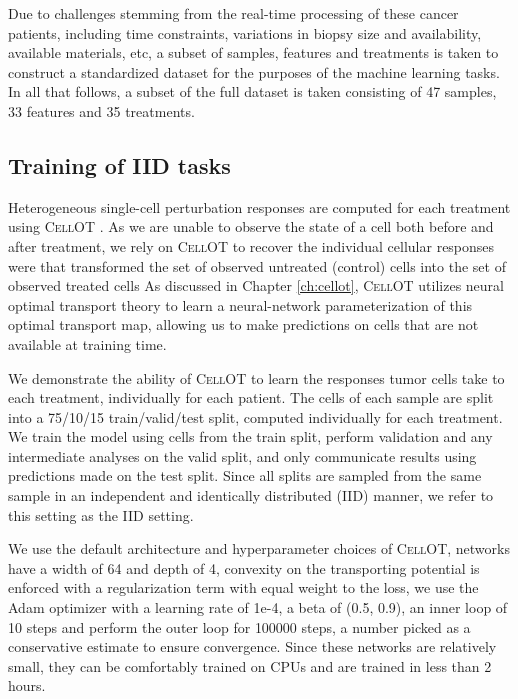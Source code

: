 Due to challenges stemming from the real-time processing of these cancer patients, including time constraints, variations in biopsy size and availability, available materials, etc, a subset of samples, features and treatments is taken to construct a standardized dataset for the purposes of the machine learning tasks.
In all that follows, a subset of the full dataset is taken consisting of 47 samples, 33 features and 35 treatments.



\subsection{Training of IID tasks}
Heterogeneous single-cell perturbation responses are computed for each treatment using \textsc{CellOT} \cite{bunne2023}.
As we are unable to observe the state of a cell both before and after treatment, we rely on \textsc{CellOT} to recover the individual cellular responses were that transformed the set of observed untreated (control) cells into the set of observed treated cells
As discussed in Chapter \ref{ch:cellot}, \textsc{CellOT} utilizes neural optimal transport theory to learn a neural-network parameterization of this optimal transport map, allowing us to make predictions on cells that are not available at training time.

We demonstrate the ability of \textsc{CellOT} to learn the responses tumor cells take to each treatment, individually for each patient. The cells of each sample are split into a 75/10/15 train/valid/test split, computed individually for each treatment. We train the model using cells from the train split, perform validation and any intermediate analyses on the valid split, and only communicate results using predictions made on the test split. Since all splits are sampled from the same sample in an independent and identically distributed (IID) manner, we refer to this setting as the IID setting.

We use the default architecture and hyperparameter choices of \textsc{CellOT}, networks have a width of 64 and depth of 4, convexity on the transporting potential is enforced with a regularization term with equal weight to the loss, we use the Adam optimizer \cite{kingma2014} with a learning rate of 1e-4, a beta of (0.5, 0.9), an inner loop of 10 steps and perform the outer loop for 100000 steps, a number picked as a conservative estimate to ensure convergence. Since these networks are relatively small, they can be comfortably trained on CPUs and are trained in less than 2 hours. 

